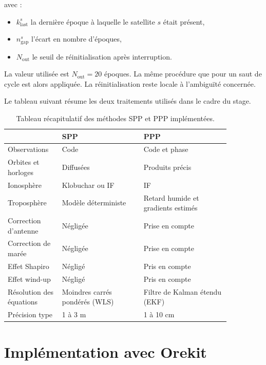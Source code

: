 avec :

\begin{itemize}
    \item $k_{\mathrm{last}}^s$ la dernière époque à laquelle le satellite $s$
    était présent,
    \item $n_{\mathrm{gap}}^s$ l'écart en nombre d'époques,
    \item $N_{\mathrm{out}}$ le seuil de réinitialisation après interruption.
\end{itemize}

La valeur utilisée est $N_{\mathrm{out}}=20$ époques. La même procédure que
pour un saut de cycle est alors appliquée. La réinitialisation reste locale à
l'ambiguïté concernée.
\fi

Le tableau suivant résume les deux traitements utilisés dans le cadre du stage.



\begin{table}[htbp]
\centering
\small
\begin{tabular}{|p{0.20\linewidth}|p{0.32\linewidth}|p{0.34\linewidth}|}
\hline
  & \textbf{SPP}  & \textbf{PPP}  \\\hline
Observations & Code & Code et phase \\\hline
Orbites et horloges & Diffusées & Produits précis \\\hline
Ionosphère & Klobuchar ou IF & IF \\\hline
Troposphère & Modèle déterministe & Retard humide et gradients estimés   \\\hline
Correction d'antenne & Négligée & Prise en compte  \\\hline
Correction de marée & Négligée & Prise en compte  \\\hline
Effet Shapiro & Négligé & Pris en compte  \\\hline
Effet wind-up & Négligé & Pris en compte  \\\hline
Résolution des équations & Moindres carrés pondérés (WLS)  & Filtre de Kalman étendu (EKF)  \\\hline
Précision type & 1 à 3 m  & 1 à 10 cm  \\\hline
\end{tabular}
\caption{Tableau récapitulatif des méthodes SPP et PPP implémentées.}
\label{new:summary}
\end{table}

\section{Implémentation avec Orekit}
\label{sec:implementation_nouvelle}

